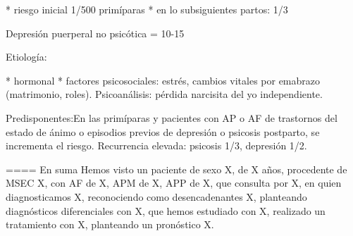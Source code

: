 * riesgo inicial 1/500 primíparas
* en lo subsiguientes partos: 1/3

Depresión puerperal no psicótica = 10-15%

Etiología:

* hormonal
* factores psicosociales: estrés, cambios vitales por emabrazo (matrimonio, roles). Psicoanálisis: pérdida narcisita del yo independiente.

Predisponentes:En las primíparas y pacientes con AP o AF de trastornos del estado de ánimo o episodios previos de depresión o psicosis postparto, se incrementa el riesgo.
Recurrencia elevada: psicosis 1/3, depresión 1/2.

==== En suma
Hemos visto un paciente de sexo X, de X años, procedente de MSEC X, con AF de X, APM de X, APP de X, que consulta por X, en quien diagnosticamos X, reconociendo como desencadenantes X, planteando diagnósticos diferenciales con X, que hemos estudiado con X, realizado un tratamiento con X, planteando un pronóstico X.

\printbibliography[]
